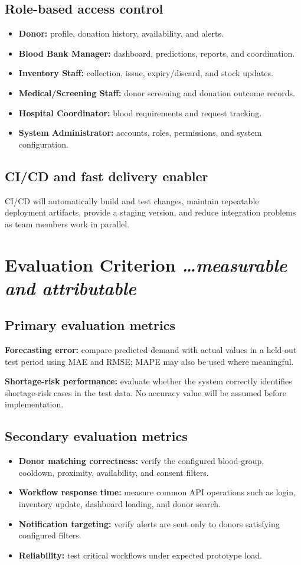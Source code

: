 \documentclass[11pt,a4paper]{article}
\newcommand{\BvrHint}[1]{{\normalfont\normalsize\itshape\hfill #1}}
\begin{document}
\subsection{Role-based access control}
\begin{itemize}[leftmargin=0.7cm]
\item \textbf{Donor:} profile, donation history, availability, and alerts.
\item \textbf{Blood Bank Manager:} dashboard, predictions, reports, and coordination.
\item \textbf{Inventory Staff:} collection, issue, expiry/discard, and stock updates.
\item \textbf{Medical/Screening Staff:} donor screening and donation outcome records.
\item \textbf{Hospital Coordinator:} blood requirements and request tracking.
\item \textbf{System Administrator:} accounts, roles, permissions, and system configuration.
\end{itemize}

\subsection{CI/CD and fast delivery enabler}
CI/CD will automatically build and test changes, maintain repeatable deployment artifacts, provide a staging version, and reduce integration problems as team members work in parallel.

\section{Evaluation Criterion \BvrHint{\ldots measurable and attributable}}
\subsection{Primary evaluation metrics}
\textbf{Forecasting error:} compare predicted demand with actual values in a held-out test period using MAE and RMSE; MAPE may also be used where meaningful.

\textbf{Shortage-risk performance:} evaluate whether the system correctly identifies shortage-risk cases in the test data. No accuracy value will be assumed before implementation.

\subsection{Secondary evaluation metrics}
\begin{itemize}[leftmargin=0.7cm]
\item \textbf{Donor matching correctness:} verify the configured blood-group, cooldown, proximity, availability, and consent filters.
\item \textbf{Workflow response time:} measure common API operations such as login, inventory update, dashboard loading, and donor search.
\item \textbf{Notification targeting:} verify alerts are sent only to donors satisfying configured filters.
\item \textbf{Reliability:} test critical workflows under expected prototype load.
\end{itemize}
\end{document}
